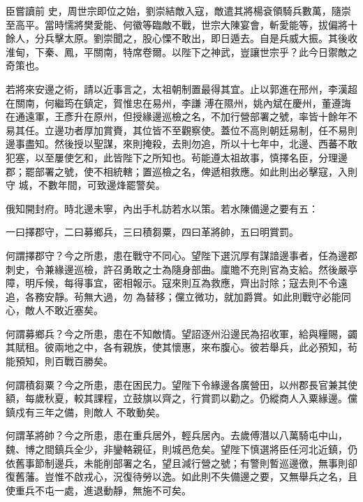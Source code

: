\begin{pinyinscope}
 臣嘗讀前
 史，周世宗即位之始，劉崇結敵入寇，敵遣其將楊袞領騎兵數萬，隨崇至高平。當時懦將樊愛能、何徽等臨敵不戰，世宗大陳宴會，斬愛能等，拔偏將十餘人，分兵擊太原。劉崇聞之，股心慄不敢出，即日遁去。自是兵威大振。其後收淮甸，下秦、鳳，平關南，特席卷爾。以陛下之神武，豈讓世宗乎？此今日禦敵之奇策也。



 若將來安邊之術，請以近事言之，太祖朝制置最得其宜。止以郭進在邢州，李漢超在關南，何繼筠在鎮定，賀惟忠在易州，李謙
 溥在隰州，姚內斌在慶州，董遵誨在通遠軍，王彥升在原州，但授緣邊巡檢之名，不加行營部署之號，率皆十餘年不易其任。立邊功者厚加賞賚，其位皆不至觀察使。蓋位不高則朝廷易制，任不易則邊事盡知。然後授以聖謀，來則掩殺，去則勿追，所以十七年中，北邊、西蕃不敢犯塞，以至屢使乞和，此皆陛下之所知也。茍能遵太祖故事，慎擇名臣，分理邊郡；罷部署之號，使不相統轄；置巡檢之名，俾遞相救應。如此則出必擊寇，入則守
 城，不數年間，可致邊烽罷警矣。



 俄知開封府。時北邊未寧，內出手札訪若水以策。若水陳備邊之要有五：



 一曰擇郡守，二曰募鄉兵，三曰積芻粟，四曰革將帥，五曰明賞罰。



 何謂擇郡守？今之所患，患在戰守不同心。望陛下選沉厚有謀諳邊事者，任為邊郡刺史，令兼緣邊巡檢，許召勇敢之士為隨身部曲。廩贍不充則官為支給。然後嚴亭障，明斥候，每得事宜，密相報示。寇來則互為救應，齊出討除；寇去則不令遠追，各務安靜。茍無大過，勿
 為替移；儻立微功，就加爵賞。如此則戰守必能同心，敵人不敢近塞矣。



 何謂募鄉兵？今之所患，患在不知敵情。望詔逐州沿邊民為招收軍，給與糧賜，蠲其賦租。彼兩地之中，各有親族，使其懷惠，來布腹心。彼若舉兵，此必預知，茍能預知，則百戰百勝矣。



 何謂積芻粟？今之所患，患在困民力。望陛下令緣邊各廣營田，以州郡長官兼其使額，每歲秋夏，較其課程，立鼓旗以齊之，行賞罰以勸之。仍縱商人入粟緣邊。儻鎮戍有三年之備，則敵人
 不敢動矣。



 何謂革將帥？今之所患，患在重兵居外，輕兵居內。去歲傅潛以八萬騎屯中山，魏、博之間鎮兵全少，非鑾輅親征，則城邑危矣。望陛下慎選將臣任河北近鎮，仍依舊事節制邊兵，未能削部署之名，望且減行營之號；有警則暫巡邊徼，無事則卻復舊藩。豈惟不啟戎心，況復待勞以逸。如此則不失備邊之要，又無舉兵之名，且使重兵不屯一處，進退動靜，無施不可矣。




\end{pinyinscope}
